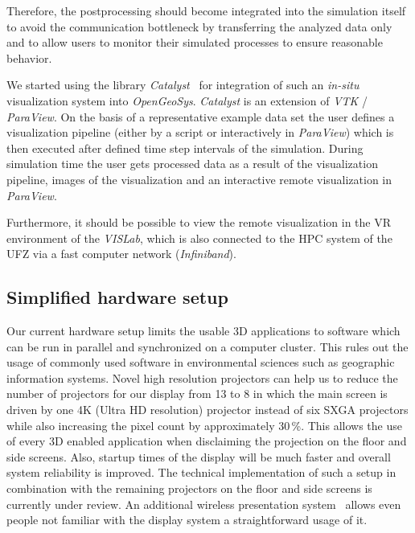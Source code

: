 \documentclass[twocolumn]{svjour3}          %
\begin{document}
Therefore, the postprocessing should become integrated into the simulation itself to avoid the communication bottleneck by transferring the analyzed data only and to allow users to monitor their simulated processes to ensure reasonable behavior.

We started using the library \emph{Catalyst}~\cite{web:catalyst} for integration of such an \emph{in-situ} visualization system into \emph{OpenGeoSys}. \emph{Catalyst} is an extension of \emph{VTK} / \emph{ParaView}. On the basis of a representative example data set the user defines a visualization pipeline (either by a script or interactively in \emph{Para\-View}) which is then executed after defined time step intervals of the simulation. During simulation time the user gets processed data as a result of the visualization pipeline, images of the visualization and an interactive remote visualization in \emph{ParaView}.

Furthermore, it should be possible to view the remote visualization in the VR environment of the \emph{VISLab}, which is also connected to the HPC system of the UFZ via a fast computer network (\emph{Infiniband}).

\subsection{Simplified hardware setup}
\label{simplified-hardware-setup}

Our current hardware setup limits the usable 3D applications to software which can be run in parallel and synchronized on a computer cluster. This rules out the usage of commonly used software in environmental sciences such as geographic information systems. Novel high resolution projectors can help us to reduce the number of projectors for our display from 13 to 8 in which the main screen is driven by one 4K (Ultra HD resolution) projector instead of six SXGA projectors while also increasing the pixel count by approximately 30\,\%. This allows the use of every 3D enabled application when disclaiming the projection on the floor and side screens. Also, startup times of the display will be much faster and overall system reliability is improved. The technical implementation of such a setup in combination with the remaining projectors on the floor and side screens is currently under review. An additional wireless presentation system~\cite{web:clickshare} allows even people not familiar with the display system a straightforward usage of it.

\end{document}
